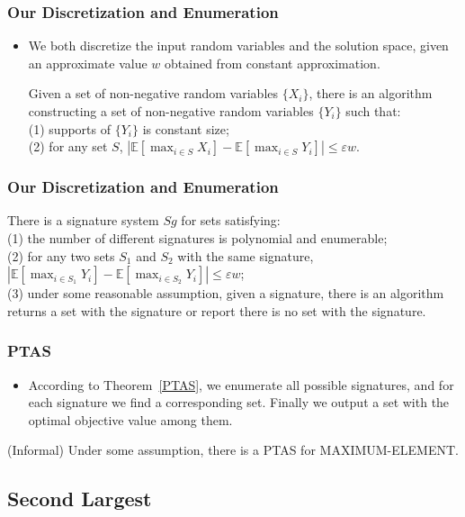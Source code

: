 \documentclass[serif,envcountsect]{beamer}
\newcommand{\Exp}{{\mathbb{E}}}
\begin{document}
\begin{frame}\frametitle{Our Discretization and Enumeration}
\begin{itemize}
\item We both discretize the input random variables and the solution space, given an approximate value $w$ obtained from constant approximation.
\begin{theorem}
Given a set of non-negative random variables $\{X_i\}$, there is an algorithm constructing a set of non-negative random variables $\{Y_i\}$ such that:\\
(1) supports of $\{Y_i\}$ is constant size;\\
(2) for any set $S$, $|\Exp[\max_{i\in S} X_i] - \Exp[\max_{i\in S} Y_i]| \leq \varepsilon w$.
\end{theorem}
\end{itemize}
\end{frame}


\begin{frame}\frametitle{Our Discretization and Enumeration}
\begin{theorem}
\label{PTAS}
There is a signature system $Sg$ for sets satisfying:\\
(1) the number of different signatures is polynomial and enumerable;\\
(2) for any two sets $S_1$ and $S_2$ with the same signature, $|\Exp[\max_{i\in S_1} Y_i] - \Exp[\max_{i\in S_2} Y_i]| \leq \varepsilon w$;\\
(3) under some reasonable assumption, given a signature, there is an algorithm returns a set with the signature or report there is no set with the signature.
\end{theorem}
\end{frame}

\begin{frame}\frametitle{PTAS}
\begin{itemize}
\item According to Theorem~\ref{PTAS}, we enumerate all possible signatures, and for each signature we find a corresponding set. Finally we output a set with the optimal objective value among them.
\end{itemize}
\begin{theorem}
(Informal) Under some assumption, there is a PTAS for MAXIMUM-ELEMENT.
\end{theorem}
\end{frame}

\subsection{Second Largest}
\end{document}
